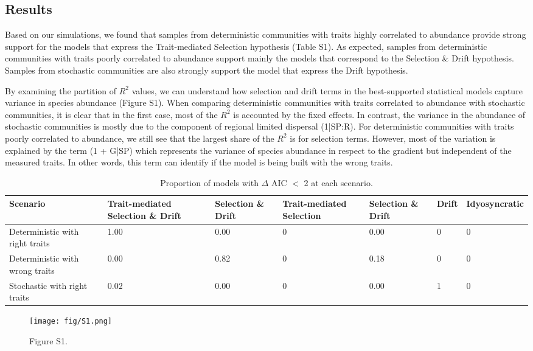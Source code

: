 \subsection*{Results}\label{results}

Based on our simulations, we found that samples from deterministic
communities with traits highly correlated to abundance provide strong
support for the models that express the Trait-mediated Selection
hypothesis (Table S1). As expected, samples from deterministic
communities with traits poorly correlated to abundance support mainly
the models that correspond to the Selection \& Drift
hypothesis. Samples from stochastic communities are also strongly
support the model that express the Drift hypothesis.

By examining the partition of $R^{2}$ values, we can understand how
selection and drift terms in the best-supported statistical models
capture variance in species abundance
(Figure S1). When comparing deterministic communities with traits
correlated to abundance with stochastic communities, it is clear that
in the first case, most of the $R^{2}$ is accounted by the fixed
effects. In contrast, the variance in the abundance of stochastic
communities is mostly due to the component of regional limited
dispersal (1|SP:R). For deterministic communities with traits poorly
correlated to abundance, we still see that the largest share of the $R^{2}$ 
is for selection terms. However, most of the variation is 
explained by the term (1 + G|SP) which represents the variance of
species abundance in respect to the gradient but independent of the
measured traits. In other words, this term can identify if the model
is being built with the wrong traits.

\begin{table}[!ht]

\caption{\label{tab:table-prop}Proportion of models with {$\Delta$} AIC {$<$}  2 at each scenario.}
\centering
\begin{tabular}[t]{p{3cm}p{2cm}p{}p{}p{2cm}p{2cm}p{2cm}}
\toprule
\textbf{Scenario} & \textbf{Trait-mediated Selection} \& \textbf{Drift} & \textbf{Selection \& Drift} & \textbf{Trait-mediated Selection} & \textbf{Selection \& Drift} & \textbf{Drift} & \textbf{Idyosyncratic}\\
\hline
Deterministic with right traits & 1.00 & 0.00 & 0 & 0.00 & 0 & 0\\
Deterministic with wrong traits & 0.00 & 0.82 & 0 & 0.18 & 0 & 0\\
Stochastic with right traits & 0.02 & 0.00 & 0 & 0.00 & 1 & 0\\
\bottomrule
\end{tabular}
\end{table}

\begin{figure}
\centering
\texttt{[image: fig/S1.png]}
\caption{Figure S1.}\label{fig:r2}
\end{figure}



